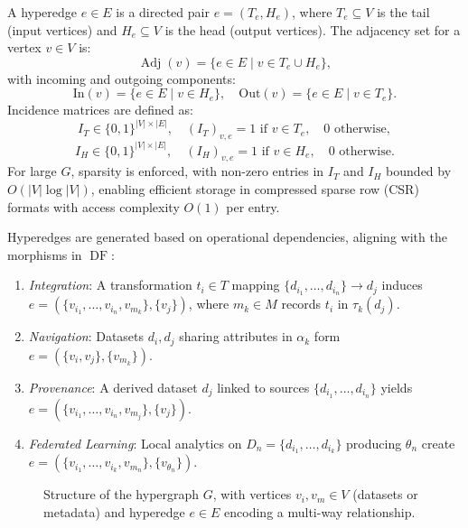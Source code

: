\documentclass{amsart}
\DeclareMathOperator\Adj{Adj}
\DeclareMathOperator\DF{DF}
\begin{document}
A hyperedge \( e \in E \) is a directed pair \( e = (T_e, H_e) \), where \( T_e \subseteq V \) is the tail (input vertices) and \( H_e \subseteq V \) is the head (output vertices). The adjacency set for a vertex \( v \in V \) is:
\[
\Adj(v) = \{ e \in E \mid v \in T_e \cup H_e \},
\]
with incoming and outgoing components:
\[
\text{In}(v) = \{ e \in E \mid v \in H_e \}, \quad \text{Out}(v) = \{ e \in E \mid v \in T_e \}.
\]
Incidence matrices are defined as:
\[
I_T \in \{0,1\}^{|V| \times |E|}, \quad (I_T)_{v,e} = 1 \text{ if } v \in T_e, \quad 0 \text{ otherwise},
\]
\[
I_H \in \{0,1\}^{|V| \times |E|}, \quad (I_H)_{v,e} = 1 \text{ if } v \in H_e, \quad 0 \text{ otherwise}.
\]
For large \( G \), sparsity is enforced, with non-zero entries in \( I_T \) and \( I_H \) bounded by \( O(|V| \log |V|) \), enabling efficient storage in compressed sparse row (CSR) formats with access complexity \( O(1) \) per entry.

Hyperedges are generated based on operational dependencies, aligning with the morphisms in \( \DF \):  %

\begin{enumerate}
    \item \emph{Integration}: A transformation \( t_i \in T \) mapping \( \{d_{i_1}, \dots, d_{i_n}\} \to d_j \) induces \( e = (\{v_{i_1}, \dots, v_{i_n}, v_{m_k}\}, \{v_j\}) \), where \( m_k \in M \) records \( t_i \) in \( \tau_k(d_j) \).
    \item \emph{Navigation}: Datasets \( d_i, d_j \) sharing attributes in \( \alpha_k \) form \( e = (\{v_i, v_j\}, \{v_{m_k}\}) \).
    \item \emph{Provenance}: A derived dataset \( d_j \) linked to sources \( \{d_{i_1}, \dots, d_{i_n}\} \) yields \( e = (\{v_{i_1}, \dots, v_{i_n}, v_{m_j}\}, \{v_j\}) \).
    \item \emph{Federated Learning}: Local analytics on \( D_n = \{d_{i_1}, \dots, d_{i_k}\} \) producing \( \theta_n \) create \( e = (\{v_{i_1}, \dots, v_{i_k}, v_{m_n}\}, \{v_{\theta_n}\}) \).
\end{enumerate}


\begin{figure}[h!]
    \centering
    \caption{Structure of the hypergraph \( G \), with vertices \( v_i, v_m \in V \) (datasets or metadata) and hyperedge \( e \in E \) encoding a multi-way relationship.}
    \label{fig:hypergraph_structure}
\end{figure}
\end{document}
